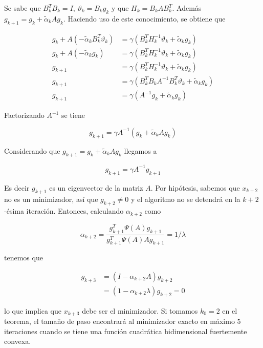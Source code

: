 Se sabe que $B^T_kB_k = I$, $\vartheta_k = B_kg_k$ y que $H_k = B_kAB_k^T$. Además $g_{k+1} = g_k+\tilde{\alpha}_kAg_k$. Haciendo uso de este conocimiento, se obtiene que

\begin{align*}
    g_k+A(-\tilde{\alpha}_kB^T_k\vartheta_k) & = \gamma(B_k^TH_k^{-1}\vartheta_k+\tilde{\alpha}_kg_k)       \\
    g_k+A(-\tilde{\alpha}_kg_k)              & = \gamma(B_k^TH_k^{-1}\vartheta_k+\tilde{\alpha}_kg_k)       \\
    g_{k+1}                                  & = \gamma(B_k^TH_k^{-1}\vartheta_k+\tilde{\alpha}_kg_k)       \\
    g_{k+1}                                  & = \gamma(B_k^TB_kA^{-1}B_k^T\vartheta_k+\tilde{\alpha}_kg_k) \\
    g_{k+1}                                  & = \gamma(A^{-1}g_k+\tilde{\alpha}_kg_k)
\end{align*}

Factorizando $A^{-1}$ se tiene

\begin{equation*}
    g_{k+1} = \gamma A^{-1}(g_k+\tilde{\alpha}_kAg_k)
\end{equation*}

Considerando que $g_{k+1} = g_k+\tilde{\alpha}_kAg_k$ llegamos a

\begin{equation*}
    g_{k+1} = \gamma A^{-1}g_{k+1}
\end{equation*}

Es decir $g_{k+1}$ es un eigenvector de la matriz $A$. Por hipótesis, sabemos que $x_{k+2}$ no es un minimizador, así que $g_{k+2}\neq 0$ y el algoritmo no se detendrá en la $k+2$-ésima iteración. Entonces, calculando $\alpha_{k+2}$ como

\begin{equation*}
    \alpha_{k+2}= \frac{g_{k+1}^T\Psi(A)g_{k+1}}{g_{k+1}^T\Psi(A)Ag_{k+1}} = 1/\lambda
\end{equation*}

tenemos que

\begin{align*}
    g_{k+3} & = (I-\alpha_{k+2}A)g_{k+2}         \\
            & = (1-\alpha_{k+2}\lambda)g_{k+2}=0
\end{align*}

lo que implica que $x_{k+3}$ debe ser el minimizador. Si tomamos $k_0 =2$ en el teorema, el tamaño de paso encontrará al minimizador exacto en máximo 5 iteraciones cuando se tiene una función cuadrática bidimensional fuertemente convexa.

